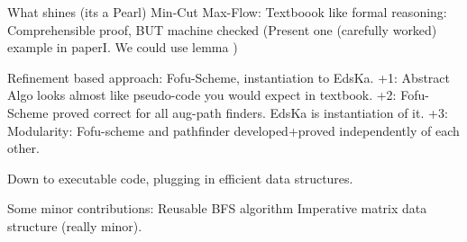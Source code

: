 \documentclass{llncs}
\begin{document}
What shines (its a Pearl)
  Min-Cut Max-Flow: Textboook like formal reasoning: Comprehensible proof, BUT machine checked
    (Present one (carefully worked) example in paperI. We could use lemma )
    
  Refinement based approach: Fofu-Scheme, instantiation to EdsKa. 
    +1: Abstract Algo looks almost like pseudo-code you would expect in textbook.
    +2: Fofu-Scheme proved correct for all aug-path finders. EdsKa is instantiation of it.
    +3: Modularity: Fofu-scheme and pathfinder developed+proved independently of each other.
  
  Down to executable code, plugging in efficient data structures.
  
Some minor contributions:
  Reusable BFS algorithm
  Imperative matrix data structure (really minor).
  
  
  
    









\end{document}
